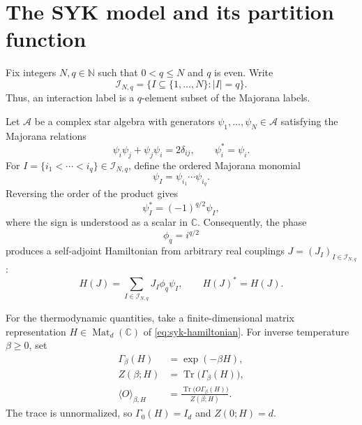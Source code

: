 \documentclass[11pt]{article}
\begin{document}
\section{The SYK model and its partition function}
\label{sec:syk-model}

Fix integers $N,q\in\mathbb{N}$ such that $0<q\leq N$ and $q$ is even. Write
\begin{equation}
  \mathcal{I}_{N,q}
  =
  \{I\subseteq\{1,\ldots,N\}: |I|=q\}.
\end{equation}
Thus, an interaction label is a $q$-element subset of the Majorana labels.

Let $\mathcal{A}$ be a complex star algebra with generators
$\psi_1,\ldots,\psi_N\in\mathcal{A}$ satisfying the Majorana relations
\begin{equation}
  \psi_i\psi_j+\psi_j\psi_i=2\delta_{ij},
  \qquad
  \psi_i^*=\psi_i.
\end{equation}
For $I=\{i_1<\cdots<i_q\}\in\mathcal{I}_{N,q}$, define the ordered
Majorana monomial
\begin{equation}
  \psi_I=\psi_{i_1}\cdots\psi_{i_q}.
\end{equation}
Reversing the order of the product gives
\begin{equation}
  \psi_I^*=(-1)^{q/2}\psi_I,
\end{equation}
where the sign is understood as a scalar in $\mathbb{C}$. Consequently, the
phase
\begin{equation}
  \phi_q=i^{q/2}
\end{equation}
produces a self-adjoint Hamiltonian from arbitrary real couplings
$J=(J_I)_{I\in\mathcal{I}_{N,q}}$:
\begin{equation}
  H(J)
  =
  \sum_{I\in\mathcal{I}_{N,q}} J_I\phi_q\psi_I,
  \qquad
  H(J)^*=H(J).
  \label{eq:syk-hamiltonian}
\end{equation}

For the thermodynamic quantities, take a finite-dimensional matrix
representation $H\in\operatorname{Mat}_d(\mathbb{C})$ of
\eqref{eq:syk-hamiltonian}. For inverse temperature $\beta\geq0$, set
\begin{align}
  \Gamma_\beta(H) &= \exp(-\beta H), \\
  Z(\beta;H) &= \operatorname{Tr}\bigl(\Gamma_\beta(H)\bigr), \\
  \langle O\rangle_{\beta,H}
    &= \frac{\operatorname{Tr}\bigl(O\Gamma_\beta(H)\bigr)}
            {Z(\beta;H)}.
\end{align}
The trace is unnormalized, so $\Gamma_0(H)=I_d$ and $Z(0;H)=d$.
\end{document}
